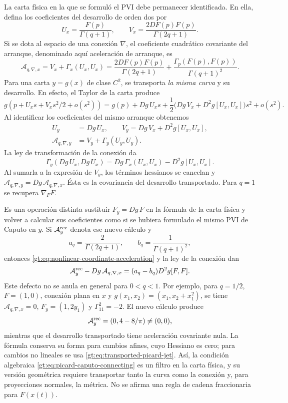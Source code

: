 La carta física en la que se formuló el PVI debe permanecer identificada.
En ella, defina los coeficientes del desarrollo de orden dos por
\[
 U_x=\frac{F(p)}{\Gamma(q+1)},\qquad
 V_x=\frac{2DF(p)F(p)}{\Gamma(2q+1)}.
\]
Si se dota al espacio de una conexión $\nabla$, el coeficiente cuadrático
covariante del arranque, denominado aquí aceleración de arranque, es
\begin{equation}
 \mathcal A_{q,\nabla,x}=V_x+\Gamma_x(U_x,U_x)=
 \frac{2DF(p)F(p)}{\Gamma(2q+1)}
 +\frac{\Gamma_p(F(p),F(p))}{\Gamma(q+1)^2}.
 \label{gt:eq:covariant-picard-acceleration}
\end{equation}
Para una carta $y=g(x)$ de clase $C^2$, se transporta \emph{la misma curva}
y su desarrollo. En efecto, el Taylor de la carta produce
\[
 g(p+U_xs+V_xs^2/2+o(s^2))
 =g(p)+Dg\,U_xs+
 \frac12\bigl(Dg\,V_x+D^2g[U_x,U_x]\bigr)s^2+o(s^2).
\]
Al identificar los coeficientes del mismo arranque obtenemos
\begin{equation}
 \begin{aligned}
 U_y&=Dg\,U_x,\qquad
 V_y=Dg\,V_x+D^2g[U_x,U_x],\\
 \mathcal A_{q,\nabla,y}&=V_y+\Gamma_y(U_y,U_y).
 \end{aligned}
 \label{gt:eq:transported-picard-jet}
\end{equation}
La ley de transformación de la conexión da
\[
 \Gamma_y(Dg\,U_x,Dg\,U_x)
 =Dg\,\Gamma_x(U_x,U_x)-D^2g[U_x,U_x].
\]
Al sumarla a la expresión de $V_y$, los términos hessianos se cancelan y
$\mathcal A_{q,\nabla,y}=Dg\,\mathcal A_{q,\nabla,x}$. Ésta es la
covariancia del desarrollo transportado. Para $q=1$ se recupera $\nabla_FF$.

Es una operación distinta sustituir $F_y=Dg\,F$ en la fórmula de la carta
física y volver a calcular sus coeficientes como si se hubiera formulado el
mismo PVI de Caputo en $y$. Si $\mathcal A^{\rm rec}_y$ denota ese nuevo
cálculo y
\[
 a_q=\frac{2}{\Gamma(2q+1)},\qquad
 b_q=\frac{1}{\Gamma(q+1)^2},
\]
entonces \eqref{gt:eq:nonlinear-coordinate-acceleration} y la ley de la
conexión dan
\begin{equation}
 \mathcal A^{\rm rec}_y-Dg\,\mathcal A_{q,\nabla,x}
 =(a_q-b_q)D^2g[F,F].
 \label{gt:eq:picard-recomputed-defect}
\end{equation}
Este defecto no se anula en general para $0<q<1$. Por ejemplo, para
$q=1/2$, $F=(1,0)$, conexión plana en $x$ y
$g(x_1,x_2)=(x_1,x_2+x_1^2)$, se tiene $\mathcal A_{q,\nabla,x}=0$,
$F_y=(1,2y_1)$ y $\Gamma^2_{11}=-2$. El nuevo cálculo produce
\[
 \mathcal A^{\rm rec}_y=(0,4-8/\pi)\ne(0,0),
\]
mientras que el desarrollo transportado tiene aceleración covariante nula.
La fórmula conserva su forma para cambios afines, cuyo Hessiano es cero;
para cambios no lineales se usa \eqref{gt:eq:transported-picard-jet}.
Así, la condición algebraica \eqref{gt:eq:picard-caputo-connecting} es un
filtro en la carta física, y su versión geométrica requiere transportar
tanto la curva como la conexión y, para proyecciones normales, la métrica.
No se afirma una regla de cadena fraccionaria para $F(x(t))$.

